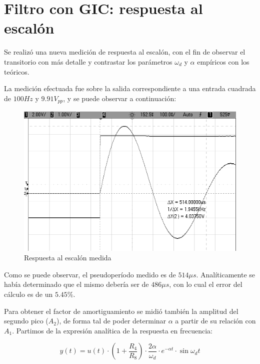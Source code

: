 \documentclass[tc_tp3_anexo_main.tex]{subfiles}
\begin{document}
\chapter{Filtro con GIC: respuesta al escal\'on}

Se realiz\'o una nueva medici\'on de respuesta al escal\'on, con el fin de observar el transitorio con m\'as detalle y contrastar los par\'ametros $\omega_d$ y $\alpha$ emp\'iricos con los te\'oricos.\par

La medici\'on efectuada fue sobre la salida correspondiente a una entrada cuadrada de $100Hz$ y $9.91V_{pp}$, y se puede observar a continuaci\'on:

\begin{figure}[H]
	\centering
	\includegraphics[scale=0.33]{fotosgic/gic_rtaesc.png}
	\caption{Respuesta al escal\'on medida}
\end{figure}

Como se puede observar, el pseudoper\'iodo medido es de $514\mu s$. Anal\'iticamente se hab\'ia determinado que el mismo deber\'ia ser de $486\mu s$, con lo cual el error del c\'alculo es de un $5.45\%$.\par 

Para obtener el factor de amortiguamiento se midi\'o tambi\'en la amplitud del segundo pico ($A_2$), de forma tal de poder determinar $\alpha$ a partir de su relaci\'on con $A_1$. Partimos de la expresi\'on anal\'itica de la respuesta en frecuencia:\par

\begin{equation}
	y(t) = u(t) \cdot \left(1+\frac{R_4}{R_8} \right) \cdot \frac{2\alpha}{\omega_d} \cdot e^{-\alpha t}\cdot \sin{\omega_d t} 
\end{equation}
\end{document}
